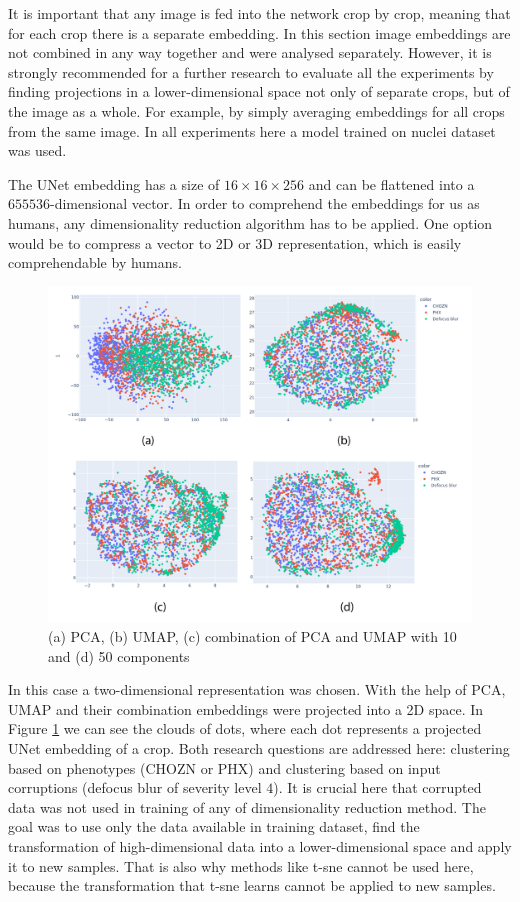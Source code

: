 It is important that any image is fed into the network crop by crop, meaning that for each crop there is a separate embedding. In this section image embeddings are not combined in any way together and were analysed separately. However, it is strongly recommended for a further research to evaluate all the experiments by finding projections in a lower-dimensional space not only of separate crops, but of the image as a whole. For example, by simply averaging embeddings for all crops from the same image. In all experiments here a model trained on nuclei dataset was used.

The UNet embedding has a size of $16 \times 16 \times 256$ and can be flattened into a $655536$-dimensional vector. In order to comprehend the embeddings for us as humans, any dimensionality reduction algorithm has to be applied. One option would be to compress a vector to 2D or 3D representation, which is easily comprehendable by humans.
\begin{figure}[htb]
	\includegraphics[width=\linewidth]{bilder/unet-embeddings/umap-pca-embeddings.png}
	\caption{(a) PCA, (b) UMAP, (c) combination of PCA and UMAP with 10 and (d) 50 components}\label{fig:umap-pca-embeddings}
\end{figure}

In this case a two-dimensional representation was chosen. With the help of PCA, UMAP and their combination embeddings were projected into a 2D space. In Figure \ref{fig:umap-pca-embeddings} we can see the clouds of dots, where each dot represents a projected UNet embedding of a crop. Both research questions are addressed here: clustering based on phenotypes (CHOZN or PHX) and clustering based on input corruptions (defocus blur of severity level $4$). It is crucial here that corrupted data was not used in training of any of dimensionality reduction method. The goal was to use only the data available in training dataset, find the transformation of high-dimensional data into a lower-dimensional space and apply it to new samples. That is also why methods like t-sne \cite{t-sne} cannot be used here, because the transformation that t-sne learns cannot be applied to new samples. 

